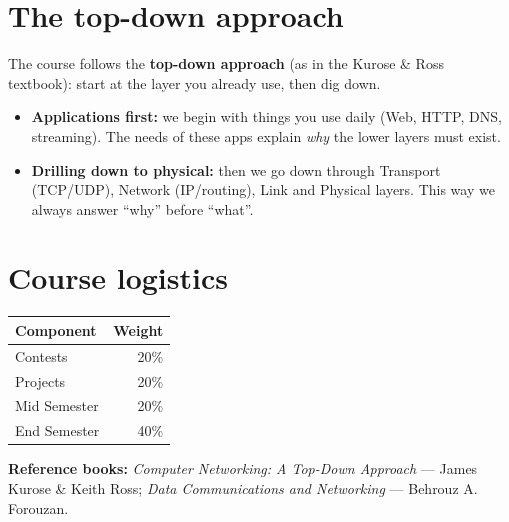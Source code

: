 \section{The top-down approach}

The course follows the \textbf{top-down approach} (as in the Kurose \& Ross textbook): start at the layer you already use, then dig down.

\begin{center}
\end{center}

\begin{itemize}
  \item \textbf{Applications first:} we begin with things you use daily (Web, HTTP, DNS, streaming). The needs of these apps explain \emph{why} the lower layers must exist.
  \item \textbf{Drilling down to physical:} then we go down through Transport (TCP/UDP), Network (IP/routing), Link and Physical layers. This way we always answer ``why'' before ``what''.
\end{itemize}

\section{Course logistics}
\begin{center}
\begin{tabular}{lr}
\toprule
Component & Weight \\
\midrule
Contests & 20\% \\
Projects & 20\% \\
Mid Semester & 20\% \\
End Semester & 40\% \\
\bottomrule
\end{tabular}
\end{center}
\textbf{Reference books:} \emph{Computer Networking: A Top-Down Approach} --- James Kurose \& Keith Ross; \emph{Data Communications and Networking} --- Behrouz A. Forouzan.

